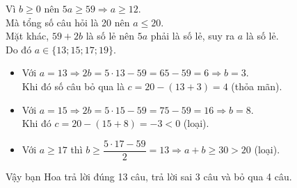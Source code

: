 \begin{bt}
{\begin{enumerate}[a)]
    Vì $b \ge 0$ nên $5a \ge 59 \Rightarrow a \ge 12$.\\
    Mà tổng số câu hỏi là 20 nên $a \le 20$.\\
    Mặt khác, $59 + 2b$ là số lẻ nên $5a$ phải là số lẻ, suy ra $a$ là số lẻ.\\
    Do đó $a \in \{13; 15; 17; 19\}$.
    \begin{itemize}
        \item Với $a = 13 \Rightarrow 2b = 5 \cdot 13 - 59 = 65 - 59 = 6 \Rightarrow b = 3$.\\
        Khi đó số câu bỏ qua là $c = 20 - (13 + 3) = 4$ (thỏa mãn).
        \item Với $a = 15 \Rightarrow 2b = 5 \cdot 15 - 59 = 75 - 59 = 16 \Rightarrow b = 8$.\\
        Khi đó $c = 20 - (15 + 8) = -3 < 0$ (loại).
        \item Với $a \ge 17$ thì $b \ge \dfrac{5 \cdot 17 - 59}{2} = 13 \Rightarrow a + b \ge 30 > 20$ (loại).
    \end{itemize}
    Vậy bạn Hoa trả lời đúng 13 câu, trả lời sai 3 câu và bỏ qua 4 câu.
\end{enumerate}
}
\end{bt}

